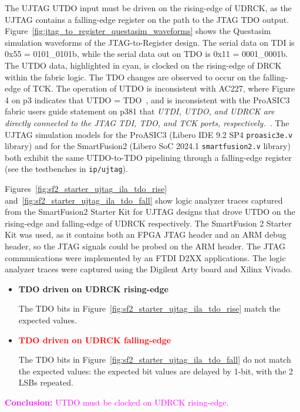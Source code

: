 The UJTAG UTDO input must be driven on the rising-edge of UDRCK, as the UJTAG
contains a falling-edge register on the path to the JTAG TDO output.
Figure~\ref{fig:jtag_to_register_questasim_waveforms} shows the Questasim
simulation waveforms of the JTAG-to-Register design. The serial data on TDI
is 0x55 = 0101\_0101b, while the serial data out on TDO is 0x11 = 0001\_0001b.
The UTDO data, highlighted in cyan, is clocked on the rising-edge of DRCK
within the fabric logic. The TDO changes are observed to occur on the
falling-edge of TCK.
%
The operation of UTDO is inconsistent with AC227, where Figure 4 on p3 indicates
that UTDO = TDO~\cite{Microchip_AC227_2015}, and is inconsistent with the ProASIC3
fabric users guide statement on p381 that \emph{UTDI, UTDO, and UDRCK are directly
connected to the JTAG TDI, TDO, and TCK ports, respectively.}~\cite{Microchip_PA3_UG_2012}.
%
The UJTAG simulation models for the ProASIC3 (Libero IDE 9.2 SP4 \verb+proasic3e.v+ library)
and for the SmartFusion2 (Libero SoC 2024.1 \verb+smartfusion2.v+ library) both
exhibit the same UTDO-to-TDO pipelining through a falling-edge register
(see the testbenches in \verb+ip/ujtag+).

Figures~\ref{fig:sf2_starter_ujtag_ila_tdo_rise}
and~\ref{fig:sf2_starter_ujtag_ila_tdo_fall} show logic analyzer traces
captured from the SmartFusion2 Starter Kit for UJTAG designs that
drove UTDO on the rising-edge and falling-edge of UDRCK respectively.
The SmartFusion 2 Starter Kit was used, as it contains both an FPGA
JTAG header and an ARM debug header, so the JTAG signals could be
probed on the ARM header. The JTAG communications were implemented by
an FTDI D2XX applications. The logic analyzer traces were captured using
the Digilent Arty board and Xilinx Vivado.
%
\begin{itemize}
\item \textcolor{OliveGreen}{\textbf{TDO driven on UDRCK rising-edge}}

The TDO bits in Figure~\ref{fig:sf2_starter_ujtag_ila_tdo_rise}
match the expected values.

\item \textcolor{red}{\textbf{TDO driven on UDRCK falling-edge}}

The TDO bits in Figure~\ref{fig:sf2_starter_ujtag_ila_tdo_fall} do not match
the expected values: the expected bit values are delayed by 1-bit,
with the 2 LSBs repeated.

\end{itemize}
%
\vskip5mm
\begin{center}
\textcolor{magenta}{\textbf{Conclusion:} UTDO must be clocked on UDRCK rising-edge.}
\end{center}

